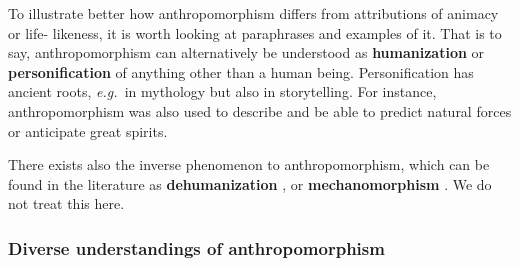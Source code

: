 \documentclass{frontiersSCNS} %
\newcommand{\eg}{{\textit{e.g.~}}}
\begin{document}
To illustrate better how anthropomorphism differs from attributions of animacy or life-
likeness, it is worth looking at paraphrases and examples of it. That is to say, 
anthropomorphism can alternatively be understood as \textbf{humanization} or 
\textbf{personification} of anything other than a human being. Personification has 
ancient roots, \eg in mythology but also in storytelling. For instance, anthropomorphism was also 
used to describe and be able to predict natural forces or anticipate great spirits.

There exists also the inverse phenomenon to anthropomorphism, which can be found in the literature as \textbf{dehumanization} \citep{haslam_dehumanization:_2006}, or \textbf{mechanomorphism} \citep{caporael_anthropomorphism_1986}. We do not treat this here.





\subsubsection{Diverse understandings of anthropomorphism\\}
\end{document}
